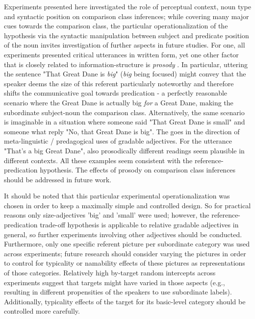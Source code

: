 Experiments presented here investigated the role of perceptual context, noun type and syntactic position on comparison class inferences; while covering many major cues towards the comparison class, the particular operationalization of the hypothesis via the syntactic manipulation between subject and predicate position of the noun invites investigation of further aspects in future studies. For one, all experiments presented critical utterances in written form, yet one other factor that is closely related to information-structure is \emph{prosody} \parencite{krifka2008basic}. In particular, uttering the sentence "That Great Dane is \emph{big}" (\emph{big} being focused) might convey that the speaker deems the size of this referent particularly noteworthy and therefore shifts the communicative goal towards predication - a perfectly reasonable scenario where the Great Dane is actually big \emph{for} a Great Dane, making the subordinate subject-noun the comparison class.  Alternatively, the same scenario is imaginable in a situation where someone said "That Great Dane is small" and someone what reply "No, that Great Dane is big". The goes in the direction of meta-linguistic / predagogical uses of gradable adjectives. For the utterance "That's a big Great Dane", also prosodically different readings seem plausible in different contexts. 
All these examples seem consistent with the reference-predication hypothesis.
The effects of prosody on comparison class inferences should be addressed in future work. 

It should be noted that this particular experimental operationalization was chosen in order to keep a maximally simple and controlled design. So for practical reasons only size-adjectives 'big' and 'small' were used; however, the reference-predication trade-off hypothesis is applicable to relative gradable adjectives in general, so further experiments involving other adjectives should be conducted. Furthermore, only one specific referent picture per subordinate category was used across experiments; future research should consider varying the pictures in order to control for typicality or namability effects of these pictures as representations of those categories. Relatively high by-target random intercepts across experiments suggest that targets might have varied in those aspects (e.g., resulting in different propensities of the speakers to use subordinate labels). Additionally, typicality effects of the target for its basic-level category should be controlled more carefully. 

